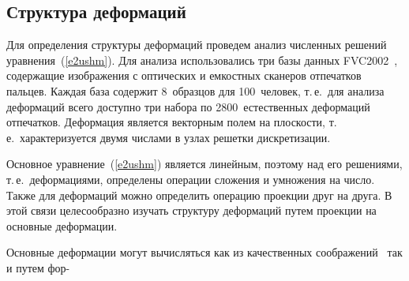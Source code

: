 \begin{multicols}{2}

     \section{Структура деформаций}
      
      Для определения структуры деформаций проведем анализ численных решений 
уравнения~(\ref{e2ushm}). Для анализа использовались три базы данных 
FVC2002~\cite{13ushm}, содержащие изображения с оптических и емкостных сканеров 
отпечатков пальцев. Каждая база содержит 8~образцов для 100~человек, т.\,е.\ для анализа 
деформаций всего доступно три набора по 2800~естественных деформаций отпечатков. 
Деформация является векторным полем на плоскости, т.\,е.\ характеризуется двумя 
числами в узлах решетки дискретизации. 
      
      Основное уравнение~(\ref{e2ushm}) является линейным, поэтому над его 
решениями, т.\,е.\ деформациями, определены операции сложения и умножения на число. 
Также для деформаций можно определить операцию проекции друг на друга. В этой связи 
целесообразно изучать структуру деформаций путем проекции на основные деформации. 
      
      Основные деформации могут вычисляться как из качественных 
соображений~\cite{10ushm} так и путем фор-\linebreak\vspace*{-12pt}
\pagebreak

\end{multicols}

\begin{figure} %
\vspace*{1pt}
\begin{center}
\mbox{%
\epsfxsize=98.317mm
}
\end{center}
\vspace*{-9pt}
\end{figure}
\begin{figure} %
\vspace*{1pt}
\begin{center}
\mbox{%
\epsfxsize=162.582mm
}
\end{center}
\vspace*{-9pt}
\end{figure}

